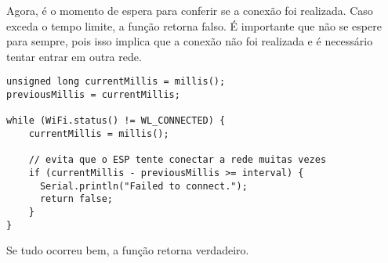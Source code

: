 Agora, é o momento de espera para conferir se a conexão foi realizada. Caso exceda o tempo limite, a função retorna falso. É importante que não se espere para sempre, pois isso implica que a conexão não foi realizada e é necessário tentar entrar em outra rede.

\begin{lstlisting}
unsigned long currentMillis = millis();
previousMillis = currentMillis;

while (WiFi.status() != WL_CONNECTED) {
    currentMillis = millis();
    
    // evita que o ESP tente conectar a rede muitas vezes
    if (currentMillis - previousMillis >= interval) {
      Serial.println("Failed to connect.");
      return false;
    }
}
\end{lstlisting}

Se tudo ocorreu bem, a função retorna verdadeiro.

